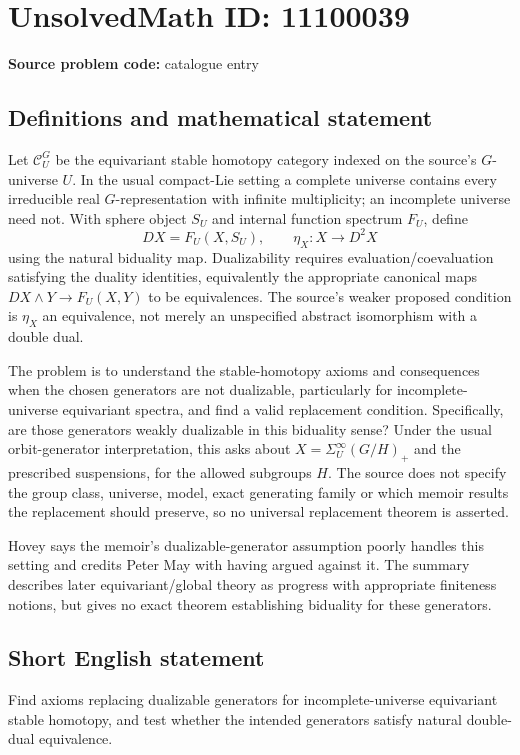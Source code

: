 \documentclass[11pt]{article}
\begin{document}
\section*{UnsolvedMath ID: 11100039}
\textbf{Source problem code:} catalogue entry
\subsection{Definitions and mathematical statement}
Let \(\mathcal C_U^G\) be the equivariant stable homotopy category indexed on the source's \(G\)-universe \(U\). In the usual compact-Lie setting a complete universe contains every irreducible real \(G\)-representation with infinite multiplicity; an incomplete universe need not. With sphere object \(S_U\) and internal function spectrum \(F_U\), define
\[
 DX=F_U(X,S_U),\qquad \eta_X:X\longrightarrow D^2X
\]
using the natural biduality map. Dualizability requires evaluation/coevaluation satisfying the duality identities, equivalently the appropriate canonical maps \(DX\wedge Y\to F_U(X,Y)\) to be equivalences. The source's weaker proposed condition is \(\eta_X\) an equivalence, not merely an unspecified abstract isomorphism with a double dual.

The problem is to understand the stable-homotopy axioms and consequences when the chosen generators are not dualizable, particularly for incomplete-universe equivariant spectra, and find a valid replacement condition. Specifically, are those generators weakly dualizable in this biduality sense? Under the usual orbit-generator interpretation, this asks about \(X=\Sigma^\infty_U(G/H)_+\) and the prescribed suspensions, for the allowed subgroups \(H\). The source does not specify the group class, universe, model, exact generating family or which memoir results the replacement should preserve, so no universal replacement theorem is asserted.

Hovey says the memoir's dualizable-generator assumption poorly handles this setting and credits Peter May with having argued against it. The summary describes later equivariant/global theory as progress with appropriate finiteness notions, but gives no exact theorem establishing biduality for these generators.
\subsection{Short English statement}
Find axioms replacing dualizable generators for incomplete-universe equivariant stable homotopy, and test whether the intended generators satisfy natural double-dual equivalence.
\end{document}
